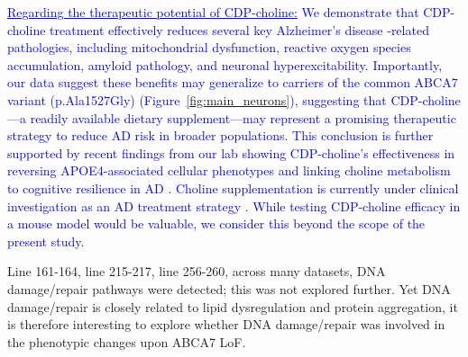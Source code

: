 \textcolor{blue}{\underline{Regarding the therapeutic potential of CDP-choline:} We demonstrate that CDP-choline treatment effectively reduces several key Alzheimer's disease -related pathologies, including mitochondrial dysfunction, reactive oxygen species accumulation, amyloid pathology, and neuronal hyperexcitability. Importantly, our data suggest these benefits may generalize to carriers of the common ABCA7 variant (p.Ala1527Gly) (Figure~\ref{fig:main_neurons}), suggesting that CDP-choline—a readily available dietary supplement—may represent a promising therapeutic strategy to reduce AD risk in broader populations. This conclusion is further supported by recent findings from our lab showing CDP-choline's effectiveness in reversing APOE4-associated cellular phenotypes \cite{Sienski2021-zt} and linking choline metabolism to cognitive resilience in AD \cite{Mathys2024-ex}. Choline supplementation is currently under clinical investigation as an AD treatment strategy \cite{Cummings2024-cu}. While testing CDP-choline efficacy in a mouse model would be valuable, we consider this beyond the scope of the present study.}


Line 161-164, line 215-217, line 256-260, across many datasets, DNA damage/repair pathways were detected; this was not explored further. Yet DNA damage/repair is closely related to lipid dysregulation and protein aggregation, it is therefore interesting to explore whether DNA damage/repair was involved in the phenotypic changes upon ABCA7 LoF.

